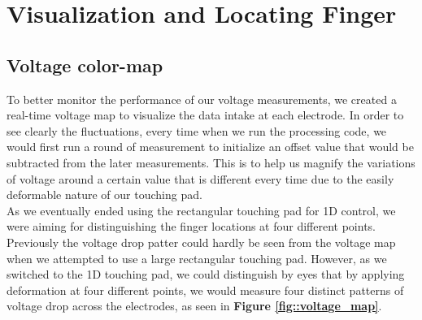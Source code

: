 \documentclass[reprint,amsmath, amsfonts, amssymb, aps, letterpaper]{revtex4-1}
\begin{document}
\section{Visualization and Locating Finger}
\subsection{Voltage color-map}
To better monitor the performance of our voltage measurements, we created a real-time voltage map to visualize the data intake at each electrode. In order to see clearly the fluctuations, every time when we run the processing code, we would first run a round of measurement to initialize an offset value that would be subtracted from the later measurements. This is to help us magnify the variations of voltage around a certain value that is different every time due to the easily deformable nature of our touching pad.
\\\indent As we eventually ended using the rectangular touching pad for 1D control, we were aiming for distinguishing the finger locations at four different points. Previously the voltage drop patter could hardly be seen from the voltage map when we attempted to use a large rectangular touching pad. However, as we switched to the 1D touching pad, we could distinguish by eyes that by applying deformation at four different points, we would measure four distinct patterns of voltage drop across the electrodes, as seen in \textbf{Figure  \ref{fig::voltage_map}}.
\end{document}
